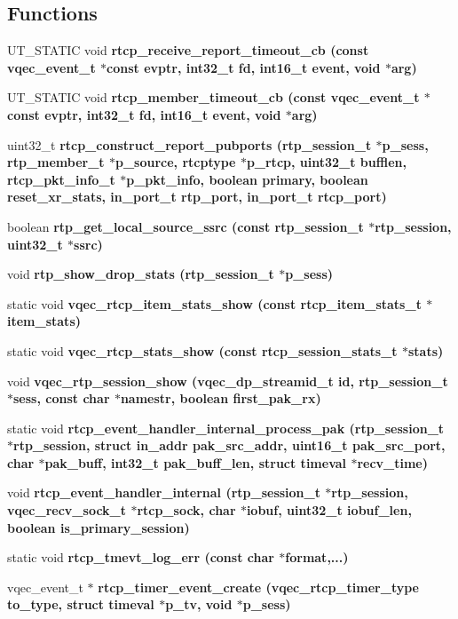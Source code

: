 \subsection*{Functions}
\begin{CompactItemize}
\item 
UT\_\-STATIC void \bf{rtcp\_\-receive\_\-report\_\-timeout\_\-cb} (const vqec\_\-event\_\-t $\ast$const evptr, int32\_\-t fd, int16\_\-t event, void $\ast$arg)
\item 
UT\_\-STATIC void \bf{rtcp\_\-member\_\-timeout\_\-cb} (const vqec\_\-event\_\-t $\ast$const evptr, int32\_\-t fd, int16\_\-t event, void $\ast$arg)
\item 
uint32\_\-t \bf{rtcp\_\-construct\_\-report\_\-pubports} (rtp\_\-session\_\-t $\ast$p\_\-sess, rtp\_\-member\_\-t $\ast$p\_\-source, rtcptype $\ast$p\_\-rtcp, uint32\_\-t bufflen, rtcp\_\-pkt\_\-info\_\-t $\ast$p\_\-pkt\_\-info, boolean primary, boolean reset\_\-xr\_\-stats, in\_\-port\_\-t rtp\_\-port, in\_\-port\_\-t rtcp\_\-port)
\item 
boolean \bf{rtp\_\-get\_\-local\_\-source\_\-ssrc} (const rtp\_\-session\_\-t $\ast$rtp\_\-session, uint32\_\-t $\ast$ssrc)
\item 
void \bf{rtp\_\-show\_\-drop\_\-stats} (rtp\_\-session\_\-t $\ast$p\_\-sess)
\item 
static void \bf{vqec\_\-rtcp\_\-item\_\-stats\_\-show} (const rtcp\_\-item\_\-stats\_\-t $\ast$item\_\-stats)
\item 
static void \bf{vqec\_\-rtcp\_\-stats\_\-show} (const rtcp\_\-session\_\-stats\_\-t $\ast$stats)
\item 
void \bf{vqec\_\-rtp\_\-session\_\-show} (vqec\_\-dp\_\-streamid\_\-t id, rtp\_\-session\_\-t $\ast$sess, const char $\ast$namestr, boolean first\_\-pak\_\-rx)
\item 
static void \bf{rtcp\_\-event\_\-handler\_\-internal\_\-process\_\-pak} (rtp\_\-session\_\-t $\ast$rtp\_\-session, struct in\_\-addr pak\_\-src\_\-addr, uint16\_\-t pak\_\-src\_\-port, char $\ast$pak\_\-buff, int32\_\-t pak\_\-buff\_\-len, struct timeval $\ast$recv\_\-time)
\item 
void \bf{rtcp\_\-event\_\-handler\_\-internal} (rtp\_\-session\_\-t $\ast$rtp\_\-session, vqec\_\-recv\_\-sock\_\-t $\ast$rtcp\_\-sock, char $\ast$iobuf, uint32\_\-t iobuf\_\-len, boolean is\_\-primary\_\-session)
\item 
static void \bf{rtcp\_\-tmevt\_\-log\_\-err} (const char $\ast$format,...)
\item 
vqec\_\-event\_\-t $\ast$ \bf{rtcp\_\-timer\_\-event\_\-create} (\bf{vqec\_\-rtcp\_\-timer\_\-type} to\_\-type, struct timeval $\ast$p\_\-tv, void $\ast$p\_\-sess)

\end{CompactItemize}
